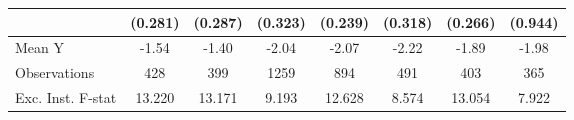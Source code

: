 {\begin{tabular}{l*{7}{c}}
            &     (0.281)         &     (0.287)         &     (0.323)         &     (0.239)         &     (0.318)         &     (0.266)         &     (0.944)         \\
\midrule
Mean Y      &       -1.54         &       -1.40         &       -2.04         &       -2.07         &       -2.22         &       -1.89         &       -1.98         \\
Observations&         428         &         399         &        1259         &         894         &         491         &         403         &         365         \\
Exc. Inst. F-stat&      13.220         &      13.171         &       9.193         &      12.628         &       8.574         &      13.054         &       7.922         \\
\bottomrule
\end{tabular}
}

